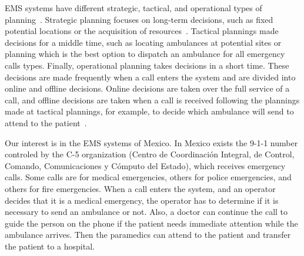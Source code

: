 EMS systems have different strategic, tactical, and operational types of plan\-ning~\cite{galvao2008emergency}. Strategic planning focuses on long-term decisions, such as fixed potential locations or the acquisition of resources~\cite{aboueljinane2013review}. Tactical plannings made decisions for a middle time, such as locating ambulances at potential sites or planning which is the best option to dispatch an ambulance for all emergency calls types. Finally, operational planning takes decisions in a short time. These decisions are made frequently when a call enters the system and are divided into online and offline decisions. Online decisions are taken over the full service of a call, and offline decisions are taken when a call is received following the plannings made at tactical plannings, for example, to decide which ambulance will send to attend to the pa\-tient~\cite{hulshof2012taxonomic}.

Our interest is in the EMS systems of Mexico. In Mexico exists the 9-1-1 number controled by the C-5 organization (Centro de Coordinación Integral, de Control, Comando, Comunicaciones y Cómputo del Estado), which receives emergency calls. Some calls are for medical emergencies, others for police e\-mer\-gen\-cies, and others for fire emergencies. When a call enters the system, and an operator decides that it is a medical emergency, the operator has to determine if it is necessary to send an ambulance or not. Also, a doctor can continue the call to guide the person on the phone if the patient needs immediate attention while the ambulance arrives. Then the paramedics can attend to the patient and transfer the patient to a hospital.


